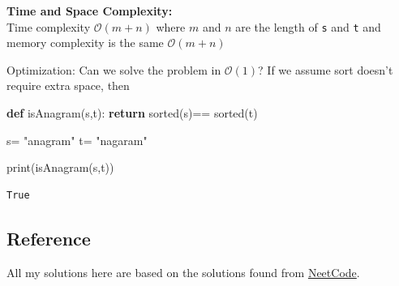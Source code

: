 \documentclass[
  letterpaper,
  DIV=11,
  numbers=noendperiod]{scrartcl}
\newenvironment{Shaded}{\begin{snugshade}}{\end{snugshade}}
\newcommand{\BuiltInTok}[1]{\textcolor[rgb]{0.00,0.23,0.31}{#1}}
\newcommand{\ControlFlowTok}[1]{\textcolor[rgb]{0.00,0.23,0.31}{\textbf{#1}}}
\newcommand{\KeywordTok}[1]{\textcolor[rgb]{0.00,0.23,0.31}{\textbf{#1}}}
\newcommand{\NormalTok}[1]{\textcolor[rgb]{0.00,0.23,0.31}{#1}}
\newcommand{\OperatorTok}[1]{\textcolor[rgb]{0.37,0.37,0.37}{#1}}
\newcommand{\StringTok}[1]{\textcolor[rgb]{0.13,0.47,0.30}{#1}}
\begin{document}
\begin{tcolorbox}[enhanced jigsaw, arc=.35mm, bottomrule=.15mm, breakable, colback=white, colframe=quarto-callout-note-color-frame, left=2mm, leftrule=.75mm, opacityback=0, rightrule=.15mm, toprule=.15mm]
\textbf{Time and Space Complexity:}\\
Time complexity \(\mathcal{O}(m+n)\) where \(m\) and \(n\) are the
length of \texttt{s} and \texttt{t} and memory complexity is the same
\(\mathcal{O}(m+n)\)

Optimization: Can we solve the problem in \(\mathcal{O}(1)\)? If we
assume sort doesn't require extra space, then

\begin{Shaded}
\begin{Highlighting}[]
\KeywordTok{def}\NormalTok{ isAnagram(s,t):}
  \ControlFlowTok{return} \BuiltInTok{sorted}\NormalTok{(s)}\OperatorTok{==} \BuiltInTok{sorted}\NormalTok{(t)}

\NormalTok{s}\OperatorTok{=} \StringTok{"anagram"}
\NormalTok{t}\OperatorTok{=} \StringTok{"nagaram"}

\BuiltInTok{print}\NormalTok{(isAnagram(s,t))}
\end{Highlighting}
\end{Shaded}

\begin{verbatim}
True
\end{verbatim}

\end{tcolorbox}

\subsection{Reference}\label{reference}

All my solutions here are based on the solutions found from
\href{https://www.youtube.com/c/neetcode}{NeetCode}.


\printbibliography
\end{document}
